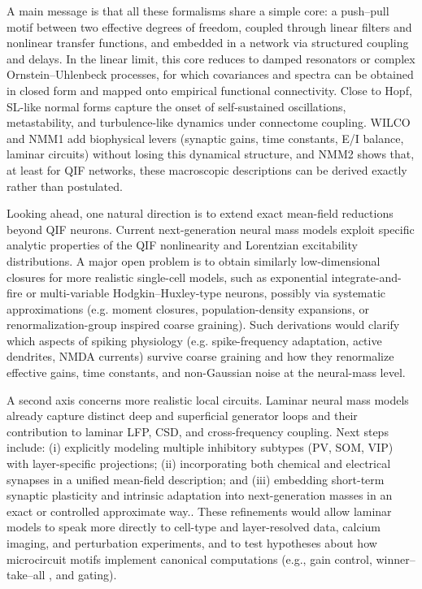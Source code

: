 \documentclass[12pt]{article}
\numberwithin{equation}{section}
\begin{document}
A main message is that all these formalisms share a simple core: a push–pull motif between two effective degrees of freedom, coupled through linear filters and nonlinear transfer functions, and embedded in a network via structured coupling and delays. In the linear limit, this core reduces to damped resonators or complex Ornstein–Uhlenbeck processes, for which covariances and spectra can be obtained in closed form and mapped onto empirical functional connectivity.\cite{ponce-alvarezHopfWholebrainModel2024,Nozari2024} Close to Hopf, SL-like normal forms capture the onset of self-sustained oscillations, metastability, and turbulence-like dynamics under connectome coupling.\cite{decoTurbulentlikeDynamicsHuman2020,cabralMetastableOscillatoryModes2022,Escrichs2022Turbulence} WILCO and NMM1 add biophysical levers (synaptic gains, time constants, E/I balance, laminar circuits) without losing this dynamical structure, and NMM2 shows that, at least for QIF networks, these macroscopic descriptions can be derived exactly rather than postulated.

Looking ahead, one natural direction is to extend exact mean-field reductions beyond QIF neurons. Current next-generation neural mass models exploit specific analytic properties of the QIF nonlinearity and Lorentzian excitability distributions.\cite{montbrioMacroscopicDescriptionNetworks2015,coombesNextGenerationNeural2019} A major open problem is to obtain similarly low-dimensional closures for more realistic single-cell models, such as exponential integrate-and-fire or multi-variable Hodgkin–Huxley-type neurons, possibly via systematic approximations (e.g. moment closures, population-density expansions, or renormalization-group inspired coarse graining).\cite{nykampPopulationDensityApproach2000,buiceSystematicFluctuationExpansion2010,Goldobin2021} Such derivations would clarify which aspects of spiking physiology (e.g. spike-frequency adaptation, active dendrites, NMDA currents) survive coarse graining and how they renormalize effective gains, time constants, and non-Gaussian noise at the neural-mass level.

A second axis concerns more realistic local circuits. Laminar neural mass models already capture distinct deep and superficial generator loops and their contribution to laminar LFP, CSD, and cross-frequency coupling.\cite{sanchez-todoPhysicalNeuralMass2023,Ruffini2020P118} Next steps include: (i) explicitly modeling multiple inhibitory subtypes (PV, SOM, VIP) with layer-specific projections; (ii) incorporating both chemical and electrical synapses in a unified mean-field description; and (iii) embedding short-term synaptic plasticity and intrinsic adaptation into next-generation masses in an exact or controlled approximate way.\cite{Devalle:2017aa,taherExactNeuralMass2020,chenExactMeanfieldModels2022}. These refinements would allow laminar models to speak more directly to cell-type and layer-resolved data, calcium imaging, and perturbation experiments, and to test hypotheses about how microcircuit motifs implement canonical computations (e.g., gain control, winner–take–all , and gating).
\end{document}
